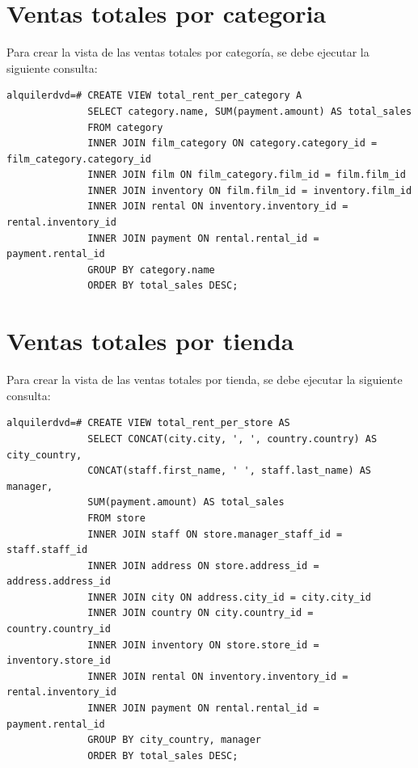 \documentclass{report}
\begin{document}
\section{Ventas totales por categoria}
Para crear la vista de las ventas totales por categoría, se debe ejecutar la siguiente consulta:
\begin{verbatim}
alquilerdvd=# CREATE VIEW total_rent_per_category A
              SELECT category.name, SUM(payment.amount) AS total_sales
              FROM category
              INNER JOIN film_category ON category.category_id = film_category.category_id
              INNER JOIN film ON film_category.film_id = film.film_id
              INNER JOIN inventory ON film.film_id = inventory.film_id
              INNER JOIN rental ON inventory.inventory_id = rental.inventory_id
              INNER JOIN payment ON rental.rental_id = payment.rental_id
              GROUP BY category.name
              ORDER BY total_sales DESC;
\end{verbatim}

\section{Ventas totales por tienda}
Para crear la vista de las ventas totales por tienda, se debe ejecutar la siguiente consulta:
\begin{verbatim}
alquilerdvd=# CREATE VIEW total_rent_per_store AS
              SELECT CONCAT(city.city, ', ', country.country) AS city_country,
              CONCAT(staff.first_name, ' ', staff.last_name) AS manager,
              SUM(payment.amount) AS total_sales
              FROM store
              INNER JOIN staff ON store.manager_staff_id = staff.staff_id
              INNER JOIN address ON store.address_id = address.address_id
              INNER JOIN city ON address.city_id = city.city_id
              INNER JOIN country ON city.country_id = country.country_id
              INNER JOIN inventory ON store.store_id = inventory.store_id
              INNER JOIN rental ON inventory.inventory_id = rental.inventory_id
              INNER JOIN payment ON rental.rental_id = payment.rental_id
              GROUP BY city_country, manager
              ORDER BY total_sales DESC;
\end{verbatim}

\cleardoublepage

\end{document}
